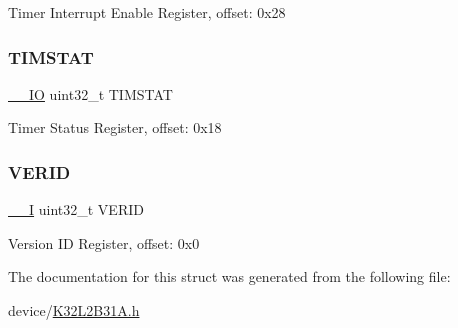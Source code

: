 Timer Interrupt Enable Register, offset\+: 0x28 \mbox{\label{struct_f_l_e_x_i_o___type_ae6ff4ad124af251e253d7c736c688675}} 
\subsubsection{\texorpdfstring{TIMSTAT}{TIMSTAT}}
{\footnotesize\ttfamily \mbox{\hyperlink{core__cm0plus_8h_aec43007d9998a0a0e01faede4133d6be}{\+\_\+\+\_\+\+IO}} uint32\+\_\+t T\+I\+M\+S\+T\+AT}

Timer Status Register, offset\+: 0x18 \mbox{\label{struct_f_l_e_x_i_o___type_ab20ff3f0387cbcc2652477ed5d2702df}} 
\subsubsection{\texorpdfstring{VERID}{VERID}}
{\footnotesize\ttfamily \mbox{\hyperlink{core__cm0plus_8h_af63697ed9952cc71e1225efe205f6cd3}{\+\_\+\+\_\+I}} uint32\+\_\+t V\+E\+R\+ID}

Version ID Register, offset\+: 0x0 

The documentation for this struct was generated from the following file\+:\begin{DoxyCompactItemize}
\item 
device/\mbox{\hyperlink{_k32_l2_b31_a_8h}{K32\+L2\+B31\+A.\+h}}\end{DoxyCompactItemize}

